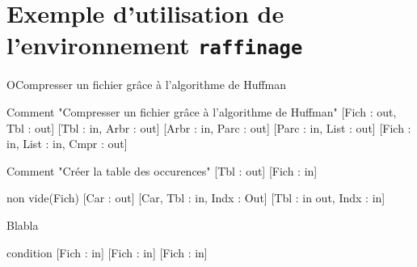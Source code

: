 \documentclass{article}
\begin{document}
\section*{Exemple d'utilisation de l'environnement \texttt{raffinage}}

\begin{raffinage}{O}{Compresser un fichier grâce à l’algorithme de Huffman}
\end{raffinage}

\begin{raffinage}{1}{Comment "Compresser un fichier grâce à l’algorithme de Huffman"}
    [Fich : out, Tbl : out]
    [Tbl : in, Arbr : out]
    [Arbr : in, Parc : out]
    [Parc : in, List : out]
    [Fich : in, List : in, Cmpr : out]
\end{raffinage}

\begin{raffinage}{2}{Comment "Créer la table des occurences"}
    [Tbl : out]
    [Fich : in]
    \begin{whilestructure}{non vide(Fich)}
        [Car : out]
        [Car, Tbl : in, Indx : Out]
        [Tbl : in out, Indx : in]
    \end{whilestructure}
\end{raffinage}

\begin{raffinage}{3}{Blabla}
    \begin{ifstructure}{condition}
        [Fich : in]
        [Fich : in]
        [Fich : in]
    \end{ifstructure}
\end{raffinage}
\end{document}
